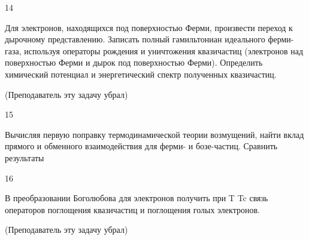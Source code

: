 \documentclass[a4paper,12pt]{article} %
\begin{document}
\begin{task}

14

Для электронов, находящихся под поверхностью Ферми, произвести переход к дырочному представлению. 
Записать полный гамильтониан идеального ферми-газа, используя операторы рождения и уничтожения квазичастиц 
(электронов над поверхностью Ферми и дырок под поверхностью Ферми). 
Определить химический потенциал и энергетический спектр полученных квазичастиц. 



(Преподаватель эту задачу убрал)










\end{task}


\begin{task}

15

Вычисляя первую поправку термодинамической теории возмущений, найти вклад прямого и обменного взаимодействия для ферми- и бозе-частиц. Сравнить результаты














\end{task}


\begin{task}

16

В преобразовании Боголюбова для электронов получить при T  Tc связь операторов поглощения квазичастиц и поглощения голых электронов.

(Преподаватель эту задачу убрал)












\end{task}
\end{document}
